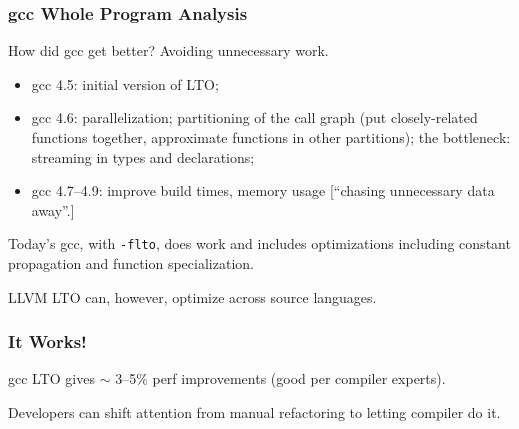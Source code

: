 \begin{frame}
\frametitle{gcc Whole Program Analysis}

{\Large How did gcc get better? Avoiding unnecessary work. }

\begin{itemize}
\item gcc 4.5: initial version of LTO;
\item gcc 4.6: parallelization; partitioning of the call graph (put closely-related functions together, approximate functions in other partitions); the bottleneck: streaming in types and declarations;
\item gcc 4.7--4.9: improve build times, memory usage [``chasing unnecessary data away''.]
\end{itemize}

Today's gcc, with {\tt -flto}, does work and includes
optimizations including constant propagation and function
specialization.

LLVM LTO can, however, optimize across source languages.

\end{frame}



\begin{frame}
\frametitle{It Works!}

\Large


gcc LTO gives $\sim$ 3--5\% perf improvements (good per compiler experts).


Developers can shift attention from 
manual refactoring to letting compiler do it.

\end{frame}





